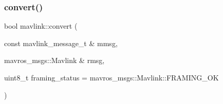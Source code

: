 \subsubsection{\texorpdfstring{convert()}{convert()}\hspace{0.1cm}{\footnotesize\ttfamily [2/2]}}
{\footnotesize\ttfamily bool mavlink\+::convert (\begin{DoxyParamCaption}\item[{const mavlink\+\_\+message\+\_\+t \&}]{mmsg,  }\item[{mavros\+\_\+msgs\+::\+Mavlink \&}]{rmsg,  }\item[{uint8\+\_\+t}]{framing\+\_\+status = {\ttfamily mavros\+\_\+msgs\+:\+:Mavlink\+:\+:FRAMING\+\_\+OK} }\end{DoxyParamCaption})\hspace{0.3cm}{\ttfamily [inline]}}

